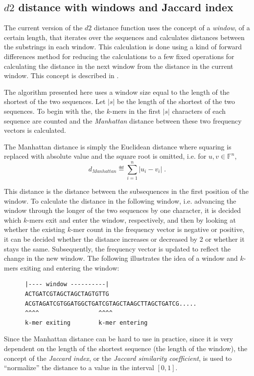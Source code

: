 \subsection{$d2$ distance with windows and Jaccard index}
The current version of the $d2$ distance function uses the concept of a
\emph{window}, of a certain length, that iterates over the sequences and
calculates distances between the substrings in each window. This calculation is
done using a kind of forward differences method for reducing the calculations
to a few fixed operations for calculating the distance in the next window from
the distance in the current window. This concept is described in
\cite{hazelhurst}.

The algorithm presented here uses a window size equal to the length of the
shortest of the two sequences. Let $|s|$ be the length of the shortest of the
two sequences. To begin with the, the $k$-mers in the first $|s|$ characters of
each sequence are counted and the \emph{Manhattan} distance between these two
frequency vectors is calculated.

The Manhattan distance is simply the Euclidean distance where squaring is
replaced with absolute value and the square root is omitted, i.e. for
$u, v \in \mathbb{F}^n$, 
\begin{equation}
  d_{Manhattan} \eqdef \sum_{i=1}^{n} |u_i - v_i| \;.
\end{equation}

This distance is the distance between the subsequences in the first position of
the window. To calculate the distance in the following window, i.e. advancing
the window through the longer of the two sequences by one character, it is
decided which $k$-mers exit and enter the window, respectively, and then by
looking at whether the existing $k$-mer count in the frequency vector is
negative or positive, it can be decided whether the distance increases or
decreased by 2 or whether it stays the same. Subsequently, the frequency vector
is updated to reflect the change in the new window. The following illustrates
the idea of a window and $k$-mers exiting and entering the window:
\begin{verbatim}
      |---- window ----------|
      ACTGATCGTAGCTAGCTAGTGTTG
      ACGTAGATCGTGGATGGCTGATCGTAGCTAAGCTTAGCTGATCG.....
      ^^^^                 ^^^^
      k-mer exiting        k-mer entering
\end{verbatim}

Since the Manhattan distance can be hard to use in practice, since it is very
dependent on the length of the shortest sequence (the length of the window),
the concept of the \emph{Jaccard index}, or the \emph{Jaccard similarity
coefficient}, is used to ``normalize'' the distance to a value in the interval
$[0,1]$.

